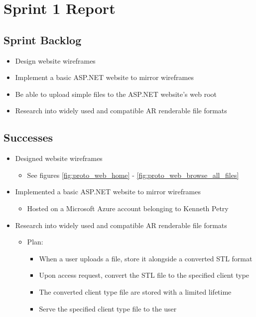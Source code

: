 
\section{Sprint 1 Report}
\label{sec:Sprint1_report}
    \subsection{Sprint Backlog}
    \label{sec:Sprint1_backlog}
    \begin{itemize}
        \item Design website wireframes 
        \item Implement a basic ASP.NET website to mirror wireframes
        \item Be able to upload simple files to the ASP.NET website's web root
        \item Research into widely used and compatible AR renderable file formats
    \end{itemize}

    \subsection{Successes}
    \label{sec:Sprint1_successes}
        \begin{itemize}
            \item Designed website wireframes
                \begin{itemize}
                    \item See figures \ref{fig:proto_web_home} - \ref{fig:proto_web_browse_all_files}
                \end{itemize}
            \item Implemented a basic ASP.NET website to mirror wireframes
                \begin{itemize}
                    \item Hosted on a Microsoft Azure account belonging to Kenneth Petry
                \end{itemize}
            \item Research into widely used and compatible AR renderable file formats
                \begin{itemize}
                    \item Plan:
                        \begin{itemize}
                            \item When a user uploads a file, store it alongside a converted STL format
                            \item Upon access request, convert the STL file to the specified client type
                            \item The converted client type file are stored with a limited lifetime
                            \item Serve the specified client type file to the user
                        \end{itemize}
                \end{itemize}
        \end{itemize}
